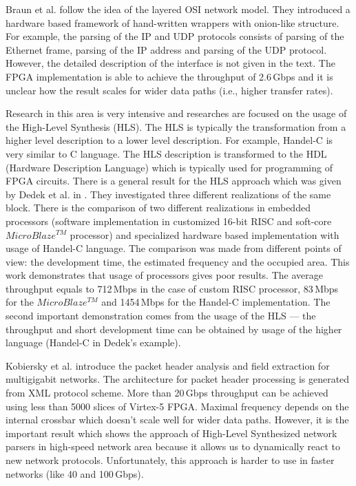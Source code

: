 Braun et al. \cite{Braun02protocolwrappers} follow the idea of the layered OSI network model. 
They introduced a hardware based framework of hand-written wrappers with onion-like structure. 
For example, the parsing of the IP and UDP protocols consists of parsing of the Ethernet frame, parsing of the IP address and parsing 
of the UDP protocol. However, the detailed description of the interface is not given in the text. The FPGA implementation is able to achieve the 
throughput of 2.6\,Gbps and it is unclear how the result scales for wider data paths (i.e., higher transfer rates).

Research in this area is very intensive and researches are focused on the usage of the High-Level Synthesis (HLS). 
The HLS is typically the transformation from a higher level description to a lower level description. 
For example, Handel-C is very similar to C language. 
The HLS description is transformed to the HDL (Hardware Description Language) which is typically used for programming of FPGA circuits. 
There is a general result for the HLS approach which was given by Dedek et al. in \cite{DedekHLS}. They investigated three different realizations of
the same block. There is the comparison
of two different realizations in embedded processors (software implementation in customized 16-bit RISC and soft-core $MicroBlaze^{TM}$ processor) 
and specialized hardware based implementation with usage of Handel-C language. 
The comparison was made from different points of view: the development time, 
the estimated frequency and the occupied area. 
This work demonstrates that usage of processors gives poor results. The average throughput equals to 712\,Mbps in 
the case of custom RISC processor, 83\,Mbps for the $MicroBlaze^{TM}$ and 1454\,Mbps for the Handel-C implementation. 
The second important demonstration comes from the usage of the HLS --- the throughput and short development time can be obtained by 
usage of the higher language (Handel-C in Dedek's example).

Kobiersky et al. \cite{Kobiersky} introduce the packet header analysis and field extraction for multigigabit networks. 
The architecture for packet header processing is generated from XML protocol scheme. More than 20\,Gbps throughput can be achieved using less 
than 5000 slices of Virtex-5 FPGA.
Maximal frequency depends on the internal crossbar which doesn't scale well for wider data paths. 
However, it is the important result which shows the approach of
High-Level Synthesized network parsers in high-speed network area because it allows us to dynamically react to new network protocols. 
Unfortunately, this approach is harder to use in faster networks (like 40 and 100\,Gbps). 

